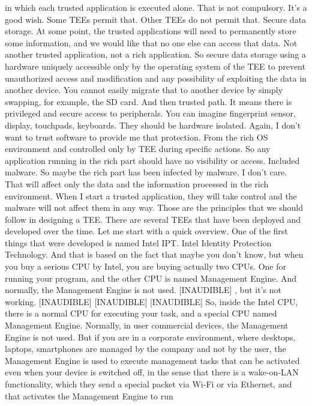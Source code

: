  in which each trusted application is executed alone. That is not compulsory.
 It's a good wish. Some TEEs permit that. Other TEEs do not permit that. Secure
 data storage. At some point, the trusted applications will need to permanently
 store some information, and we would like that no one else can access that
 data. Not another trusted application, not a rich application. So secure data
 storage using a hardware uniquely accessible only by the operating system of
 the TEE to prevent unauthorized access and modification and any possibility of
 exploiting the data in another device. You cannot easily migrate that to
 another device by simply swapping, for example, the SD card. And then trusted
 path. It means there is privileged and secure access to peripherals. You can
 imagine fingerprint sensor, display, touchpads, keyboards. They should be
 hardware isolated. Again, I don't want to trust software to provide me that
 protection. From the rich OS environment and controlled only by TEE during
 specific actions. So any application running in the rich part should have no
 visibility or access. Included malware. So maybe the rich part has been
 infected by malware. I don't care. That will affect only the data and the
 information processed in the rich environment. When I start a trusted
 application, they will take control and the malware will not affect them in
 any way. Those are the principles that we should follow in designing a TEE.
 There are several TEEs that have been deployed and developed over the time.
 Let me start with a quick overview. One of the first things that were
 developed is named Intel IPT. Intel Identity Protection Technology. And that
 is based on the fact that maybe you don't know, but when you buy a serious CPU
 by Intel, you are buying actually two CPUs. One for running your program, and
 the other CPU is named Management Engine. And normally, the Management Engine
 is not used. [INAUDIBLE] , but it's not working. [INAUDIBLE] [INAUDIBLE]
 [INAUDIBLE] So, inside the Intel CPU, there is a normal CPU for executing your
 task, and a special CPU named Management Engine. Normally, in user commercial
 devices, the Management Engine is not used. But if you are in a corporate
 environment, where desktops, laptops, smartphones are managed by the company
 and not by the user, the Management Engine is used to execute management tasks
 that can be activated even when your device is switched off, in the sense that
 there is a wake-on-LAN functionality, which they send a special packet via
 Wi-Fi or via Ethernet, and that activates the Management Engine to run
